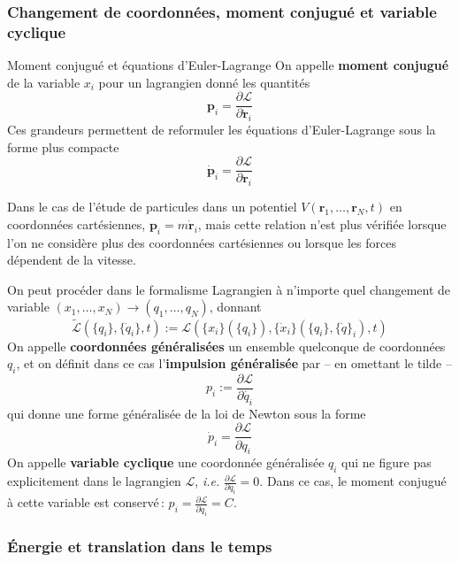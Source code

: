         \subsubsection{Changement de coordonnées, moment conjugué et variable cyclique}

        \begin{omed}{Moment conjugué et équations d’Euler-Lagrange}
            On appelle \textbf{moment conjugué} de la variable $x_i$ pour un lagrangien donné les quantités
            \[ \mathbf{p}_i = \frac{\partial \mathcal{L}}{\partial \dot{\mathbf{r}}_i} \]   
            Ces grandeurs permettent de reformuler les équations d’Euler-Lagrange sous la forme plus compacte
            \[ \dot{\mathbf{p}}_i = \frac{\partial \mathcal{L}}{\partial \mathbf{r}_i} \]   
        \end{omed}

        Dans le cas de l’étude de particules dans un potentiel $V(\mathbf{r}_1, \ldots, \mathbf{r}_N,t)$ en coordonnées cartésiennes, $\mathbf{p}_i = m \dot{\mathbf{r}}_i$, mais cette relation n’est plus vérifiée lorsque l’on ne considère plus des coordonnées cartésiennes ou lorsque les forces dépendent de la vitesse. 

        On peut procéder dans le formalisme Lagrangien à n’importe quel changement de variable $(x_1, \ldots, x_N) \to (q_1, \ldots, q_N)$, donnant
        \[ \tilde{\mathcal{L}}\left(\{q_i\}, \{\dot{q}_i\}, t\right) := \mathcal{L}\left(\{x_i\}(\{q_i\}), \{\dot{x}_i\}(\{q_i\}, \{\dot{q}\}_i), t\right) \]    
        On appelle \textbf{coordonnées généralisées} un ensemble quelconque de coordonnées $q_i$, et on définit dans ce cas l’\textbf{impulsion généralisée} par -- en omettant le tilde -- 
        \[ p_i := \frac{\partial \mathcal{L}}{\partial \dot{q_i}} \]   
        qui donne une forme généralisée de la loi de Newton sous la forme 
        \[ \dot{p}_i = \frac{\partial \mathcal{L}}{\partial q_i} \]
        On appelle \textbf{variable cyclique} une coordonnée généralisée $q_i$ qui ne figure pas explicitement dans le lagrangien $\mathcal{L}$, \textit{i.e.} $\frac{\partial \mathcal{L}}{\partial q_i} =0$. Dans ce cas, le moment conjugué à cette variable est conservé : $p_i = \frac{\partial \mathcal{L}}{\partial \dot{q}_i} = C$.

        \subsubsection{Énergie et translation dans le temps}

